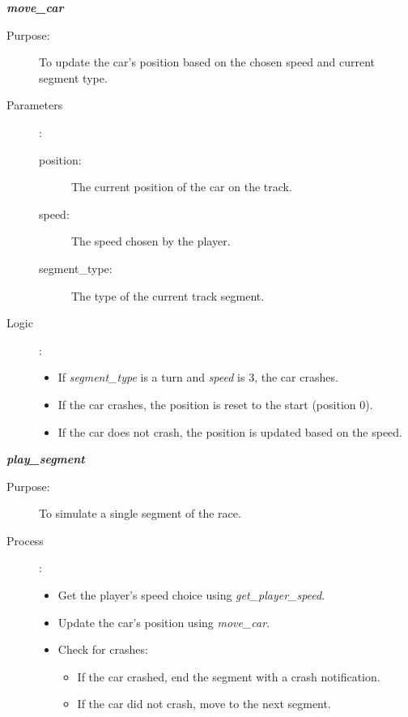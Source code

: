 \documentclass[12pt]{article}
\begin{document}
\textit{\textbf{move\_car}}
\begin{description}
    \item[Purpose:] To update the car's position based on the chosen speed and current segment type.
    \item[Parameters]:
    \begin{description}
        \item[position:] The current position of the car on the track.
        \item[speed:] The speed chosen by the player.
        \item[segment\_type:] The type of the current track segment.
    \end{description}
    \item[Logic]:
    \begin{itemize}
        \item If \textit{segment\_type} is a turn and \textit{speed} is 3, the car crashes.
        \item If the car crashes, the position is reset to the start (position 0).
        \item If the car does not crash, the position is updated based on the speed.
    \end{itemize}
\end{description}

\textit{\textbf{play\_segment}}
\begin{description}
    \item[Purpose:] To simulate a single segment of the race.
    \item[Process]:
    \begin{itemize}
        \item Get the player's speed choice using \textit{get\_player\_speed}.
        \item Update the car's position using \textit{move\_car}.
        \item Check for crashes:
        \begin{itemize}
            \item If the car crashed, end the segment with a crash notification.
            \item If the car did not crash, move to the next segment.
        \end{itemize}
    \end{itemize}
\end{description}
\end{document}
